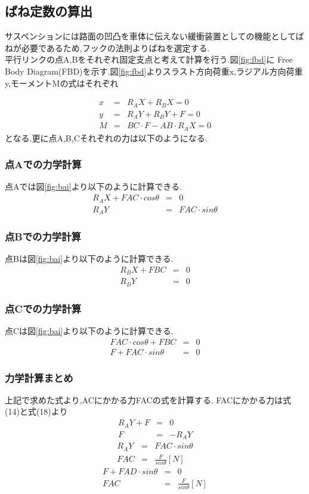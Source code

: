 \documentclass[a4paper]{jarticle}
\begin{document}
\subsection{ばね定数の算出}
サスペンションには路面の凹凸を車体に伝えない緩衝装置としての機能としてばねが必要であるため,フックの法則よりばねを選定する.　\\
平行リンクの点A,Bをそれぞれ固定支点と考えて計算を行う.図\ref{fig:fbd}に Free Body Diagram(FBD)を示す.図\ref{fig:fbd}よりスラスト方向荷重x,ラジアル方向荷重y,モーメントMの式はそれぞれ

\begin{eqnarray}
	x & = & R_AX+R_BX=0 \\
	y & = & R_AY+R_BY+F=0 \\
	M & = & BC\cdot F-AB\cdot R_AX=0
\end{eqnarray}
となる.更に点A,B,Cそれぞれの力は以下のようになる.

\subsubsection{点Aでの力学計算}
点Aでは図\ref{fig:bai}より以下のように計算できる.
\begin{eqnarray}
	R_AX+FAC\cdot cosθ & = & 0 \\
	R_AY & = & FAC\cdot sinθ 
\end{eqnarray}
\subsubsection{点Bでの力学計算}
点Bは図\ref{fig:bai}より以下のように計算できる.
\begin{eqnarray}
	R_BX+FBC & = & 0 \\
	R_BY & = & 0
\end{eqnarray}
\subsubsection{点Cでの力学計算}
点Cは図\ref{fig:bai}より以下のように計算できる.
\begin{eqnarray}
	FAC\cdot cosθ+FBC & = & 0 \\
	F+FAC\cdot sinθ & = & 0
\end{eqnarray}
\subsubsection{力学計算まとめ}
上記で求めた式より,ACにかかる力FACの式を計算する.
FACにかかる力は式(14)と式(18)より
\begin{eqnarray}
	R_AY+F & = & 0 \\
		F & = & -R_AY 
\end{eqnarray}
\begin{eqnarray}
	　　　　R_AY & = & FAC\cdot sinθ \\
		FAC & = & \frac{F}{sinθ} [N] 
\end{eqnarray}
\begin{eqnarray}
	F+FAD\cdot sinθ & = & 0 \\
	FAC & = & \frac{F}{sinθ} [N]
\end{eqnarray}
\end{document}
